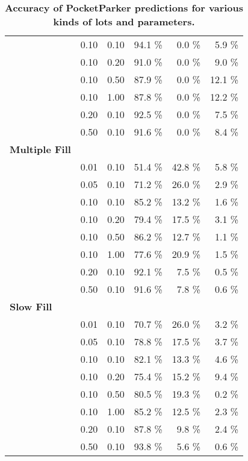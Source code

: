 \begin{table}[t!]
\begin{threeparttable}
{\begin{tabularx}{\columnwidth}{Xrrrrr}
& 0.10 & 0.10 & 94.1 \% & 0.0 \% & 5.9 \% \\
& 0.10 & 0.20 & 91.0 \% & 0.0 \% & 9.0 \% \\
& 0.10 & 0.50 & 87.9 \% & 0.0 \% & 12.1 \% \\
& 0.10 & 1.00 & 87.8 \% & 0.0 \% & 12.2 \% \\
& 0.20 & 0.10 & 92.5 \% & 0.0 \% & 7.5 \% \\
& 0.50 & 0.10 & 91.6 \% & 0.0 \% & 8.4 \% \\
\textbf{Multiple Fill} & & & & & \\
\midrule
& 0.01 & 0.10 & 51.4 \% & 42.8 \% & 5.8 \% \\
& 0.05 & 0.10 & 71.2 \% & 26.0 \% & 2.9 \% \\
& 0.10 & 0.10 & 85.2 \% & 13.2 \% & 1.6 \% \\
& 0.10 & 0.20 & 79.4 \% & 17.5 \% & 3.1 \% \\
& 0.10 & 0.50 & 86.2 \% & 12.7 \% & 1.1 \% \\
& 0.10 & 1.00 & 77.6 \% & 20.9 \% & 1.5 \% \\
& 0.20 & 0.10 & 92.1 \% & 7.5 \% & 0.5 \% \\
& 0.50 & 0.10 & 91.6 \% & 7.8 \% & 0.6 \% \\
\textbf{Slow Fill} & & & & & \\
\midrule
& 0.01 & 0.10 & 70.7 \% & 26.0 \% & 3.2 \% \\
& 0.05 & 0.10 & 78.8 \% & 17.5 \% & 3.7 \% \\
& 0.10 & 0.10 & 82.1 \% & 13.3 \% & 4.6 \% \\
& 0.10 & 0.20 & 75.4 \% & 15.2 \% & 9.4 \% \\
& 0.10 & 0.50 & 80.5 \% & 19.3 \% & 0.2 \% \\
& 0.10 & 1.00 & 85.2 \% & 12.5 \% & 2.3 \% \\
& 0.20 & 0.10 & 87.8 \% & 9.8 \% & 2.4 \% \\
& 0.50 & 0.10 & 93.8 \% & 5.6 \% & 0.6 \% \\
\end{tabularx}
}
\caption{\textbf{Accuracy of PocketParker predictions for various kinds of lots and parameters.}}
\label{table-accuracy}
\end{threeparttable}
\end{table}
